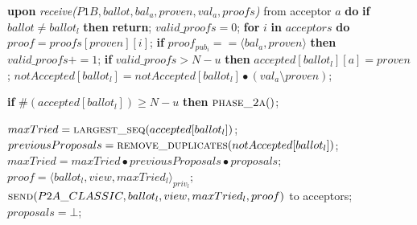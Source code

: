 \begin{algorithm}
\begin{algorithmic}[1]
		\State
		\State \textbf{upon} \textit{receive($P1B, ballot, bal_a, proven,val_a, proofs$)} from acceptor $a$ \textbf{do}
		\State \hspace{\algorithmicindent} \textbf{if} $ballot \neq ballot_l$ \textbf{then}
		\State \hspace{\algorithmicindent}\hspace{\algorithmicindent} \textbf{return};
		\State
		\State \hspace{\algorithmicindent} $valid\_proofs = 0$; 
		\State \hspace{\algorithmicindent} \textbf{for} $i$ \textbf{in} $acceptors$ \textbf{do}
		\State \hspace{\algorithmicindent}\hspace{\algorithmicindent} $proof = proofs[proven][i]$;
		\State \hspace{\algorithmicindent}\hspace{\algorithmicindent} \textbf{if} $proof_{pub_i} == \langle bal_a, proven \rangle$ \textbf{then}
		\State \hspace{\algorithmicindent}\hspace{\algorithmicindent}\hspace{\algorithmicindent} 
		$valid\_proofs \mathrel{+{=}} 1$;
		\State
		\State \hspace{\algorithmicindent} \textbf{if} $valid\_proofs > N-u$ \textbf{then}
		\State \hspace{\algorithmicindent}\hspace{\algorithmicindent} $accepted[ballot_l][a] = proven$;
		\State \hspace{\algorithmicindent}\hspace{\algorithmicindent}	$notAccepted[ballot_l] = notAccepted[ballot_l] \bullet (val_a \setminus proven)$;		
		
		\State 
		\State \hspace{\algorithmicindent}\hspace{\algorithmicindent} \textbf{if} $\#(accepted[ballot_l]) \geq N-u$ \textbf{then} 
		\State \hspace{\algorithmicindent}\hspace{\algorithmicindent}\hspace{\algorithmicindent} $\Call{phase\_2a}{ }$;
		
		\State
		\State $maxTried = \Call{largest\_seq}{accepted[ballot_l]}$;
		\State $previousProposals = \Call{remove\_duplicates}{notAccepted[ballot_l]}$;
		\State $maxTried = maxTried \bullet previousProposals \bullet proposals$;
		\State $proof = \langle ballot_l, view, maxTried_l \rangle_{priv_l}$;
		\State $\Call{send}{P2A\_CLASSIC,ballot_l,view, maxTried_l, proof}$ to acceptors;
		\State $proposals = \bot$;
		\EndFunction
		
	\end{algorithmic}
\end{algorithm}

